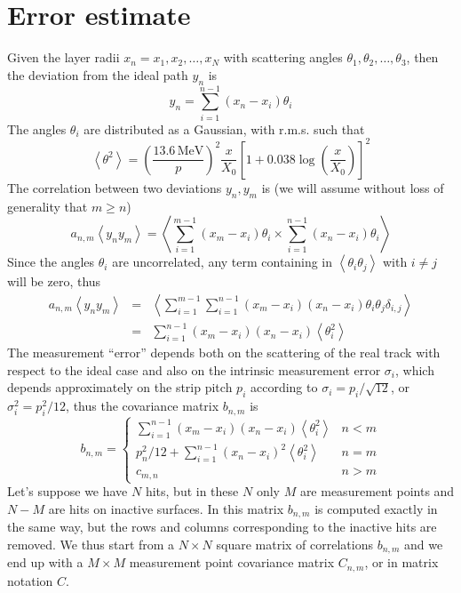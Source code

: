 \documentclass[10pt,a4paper]{article}
\begin{document}
\section{Error estimate}
Given the layer radii $x_n = x_1, x_2, \ldots, x_N$ with scattering angles $\theta_1, \theta_2, \ldots, \theta_3$, then
the deviation from the ideal path $y_n$ is
\begin{equation}
y_n=\sum_{i=1}^{n-1} \left (  x_n - x_i \right ) \theta_i
\end{equation}
The angles $\theta_i$ are distributed as a Gaussian, with r.m.s. such that
\begin{equation}
\left < \theta^2 \right > =
    \left ( \frac {13.6\,\mathrm{MeV}} {p} \right )^2
    \frac x {X_0}
    \left [ 1+ 0.038 \log \left ( \frac x {X_0} \right ) \right ] ^2
\end{equation}
The correlation between two deviations $y_n, y_m$ is (we will assume without loss of generality that $m \geq n$)
\begin{equation}
a_{n,m}\left < y_n y_m \right > =
      \left <
      \sum_{i=1}^{m-1} \left (  x_m - x_i \right ) \theta_i
      \times
      \sum_{i=1}^{n-1} \left (  x_n - x_i \right ) \theta_i
      \right >
\end{equation}
Since the angles $\theta_i$ are uncorrelated, any term containing in $\left < \theta_i \theta_j \right >$ with $i\neq j$ will be zero, thus
\begin{eqnarray}
a_{n,m}\left < y_n y_m \right > & = &
      \left <
      \sum_{i=1}^{m-1} \sum_{i=1}^{n-1}
      \left (  x_m - x_i \right )
      \left (  x_n - x_i \right ) \theta_i \theta_j \delta_{i,j}
      \right > \nonumber \\
      & = &
      \sum_{i=1}^{n-1} 
      \left (  x_m - x_i \right )
      \left (  x_n - x_i \right )  \left < \theta_i^2 \right > 
\end{eqnarray}
The measurement ``error'' depends both on the scattering of the real track with respect to the ideal case
and also on the intrinsic measurement error $\sigma_i$, which depends approximately on the strip pitch $p_i$
according to $\sigma_i = p_i / \sqrt{12}$, or $\sigma_i^2 = p_i^2 / 12$, thus the covariance matrix $b_{n,m}$ is
\begin{equation}
b_{n,m}= \left \{
\begin{array}{cl}
 \sum_{i=1}^{n-1} \left (  x_m - x_i \right ) \left (  x_n - x_i \right )  \left < \theta_i^2 \right > & n<m \\
 p_n^2 / 12 + \sum_{i=1}^{n-1} \left (  x_n - x_i \right )^2  \left < \theta_i^2 \right > & n=m \\
 c_{m,n}  & n>m
\end{array}
\right .
\end{equation}
Let's suppose we have $N$ hits, but in these $N$ only $M$ are measurement points and $N-M$ are hits
on inactive surfaces. In this matrix $b_{n,m}$ is computed exactly in the same way, but the rows
and columns corresponding to the inactive hits are removed. We thus start from a $N\times N$ square matrix
of correlations $b_{n,m}$ and we end up with a $M\times M$ measurement point covariance matrix $C_{n,m}$,
or in matrix notation $C$.


\label{LastPage}
\end{document}
